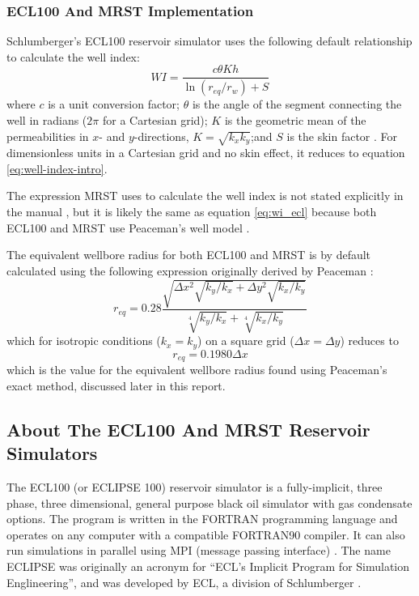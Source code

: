 \subsubsection{ECL100 And MRST Implementation} %
\label{ssub:ecl100_implementation}
Schlumberger's ECL100 reservoir simulator uses the following default relationship to calculate the well index:
\begin{equation}
    \label{eq:wi_ecl}
    WI = \frac{c\theta K h}{\ln \left(r_{eq}/r_w\right)+S}
\end{equation}
where $c$ is a unit conversion factor; $\theta$ is the angle of the segment connecting the well in radians ($2\pi$ for a Cartesian grid); $K$ is the geometric mean of the permeabilities in $x$- and $y$-directions, $K=\sqrt{k_x k_y}$;and $S$ is the skin factor \cite{Schlumberger2013Eclipse}. For dimensionless units in a Cartesian grid and no skin effect, it reduces to equation \eqref{eq:well-index-intro}.

The expression MRST uses to calculate the well index is not stated explicitly in the manual \cite{Lie2014Introduction}, but it is likely the same as equation \eqref{eq:wi_ecl} because both ECL100 and MRST use Peaceman's well model \cite{Lie2014Introduction,Schlumberger2013Eclipse}.

The equivalent wellbore radius for both ECL100 and MRST is by default calculated using the following expression \cite{Schlumberger2013Eclipse,Lie2014Introduction} originally derived by Peaceman \cite{Peaceman1983Interpretation}:
\begin{equation}
    r_{eq} = 0.28 \frac{\sqrt{\Delta x^2 \sqrt{k_y/k_x} + \Delta y^2 \sqrt{k_x/k_y}}}{\sqrt[4]{k_y/k_x}+\sqrt[4]{k_x/k_y}}
\end{equation}
which for isotropic conditions ($k_x=k_y$) on a square grid ($\Delta x= \Delta y$) reduces to
\begin{equation}
    r_{eq} = 0.1980 \Delta x
\end{equation}
which is the value for the equivalent wellbore radius found using Peaceman's exact method, discussed later in this report.

\subsection{About The ECL100 And MRST Reservoir Simulators} %
\label{sub:about_the_ecl100_and_mrst_reservoir_simulators}
The ECL100 (or ECLIPSE 100) reservoir simulator is a fully-implicit, three phase, three dimensional, general purpose black oil simulator with gas condensate options. The program is written in the FORTRAN programming language and operates on any computer with a compatible FORTRAN90 compiler. It can also run simulations in parallel using MPI (message passing interface) \cite{Schlumberger2013Eclipse}. The name ECLIPSE was originally an acronym for ``ECL's Implicit Program for Simulation Englineering'', and was developed by ECL, a division of Schlumberger \cite{Wikipedia2014Article}.

